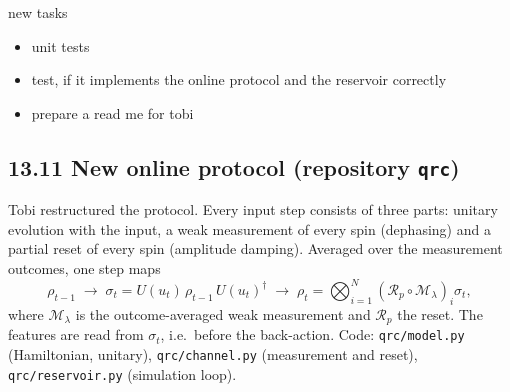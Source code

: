 new tasks
\begin{itemize}
    \item unit tests
    \item test, if it implements the online protocol and the reservoir correctly
    \item prepare a read me for tobi
\end{itemize}

\subsection*{13.11 \quad New online protocol (repository \texttt{qrc})}
\label{sec:new-protocol}
Tobi restructured the protocol. Every input step consists of three parts: unitary evolution with the
input, a weak measurement of every spin (dephasing) and a partial reset of every spin (amplitude damping).
Averaged over the measurement outcomes, one step maps
\begin{equation*}
    \rho_{t-1} \;\to\; \sigma_t = U(u_t)\,\rho_{t-1}\,U(u_t)^\dagger
    \;\to\; \rho_t = \bigotimes_{i=1}^{N} \left(\mathcal{R}_p \circ \mathcal{M}_\lambda\right)_i \sigma_t ,
\end{equation*}
where $\mathcal{M}_\lambda$ is the outcome-averaged weak measurement and $\mathcal{R}_p$ the reset.
The features are read from $\sigma_t$, i.e.\ before the back-action. Code: \texttt{qrc/model.py}
(Hamiltonian, unitary), \texttt{qrc/channel.py} (measurement and reset), \texttt{qrc/reservoir.py}
(simulation loop).

